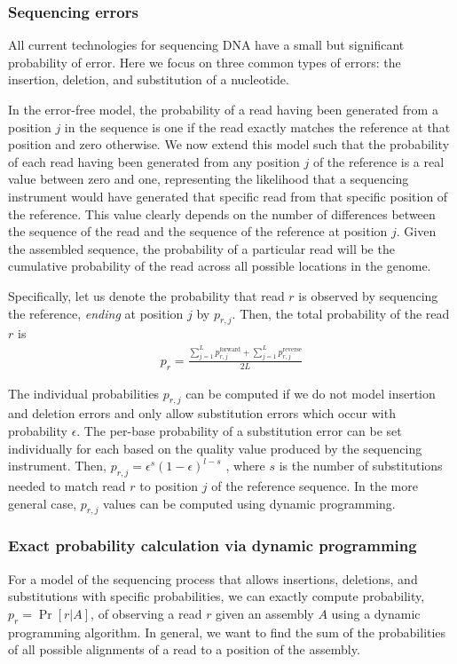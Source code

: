 \subsubsection{Sequencing errors}
\label{methods_errors}
All current technologies for sequencing DNA have a small but
significant probability of error.  Here we focus on three common types
of errors: the insertion, deletion, and substitution of a nucleotide.

In the error-free model, the probability of a read having been
generated from a position $j$ in the sequence is one if the read
exactly matches the reference at that position and zero otherwise.  We
now extend this model such that the probability of each read having
been generated from any position $j$ of the reference is a real value
between zero and one, representing the likelihood that a sequencing
instrument would have generated that specific read from that specific
position of the reference.  This value clearly depends on the number of differences
between the sequence of the read and the sequence of the reference at
position $j$.  Given the assembled sequence, the probability of a particular read will be the cumulative probability of the read
across all possible locations in the genome.

Specifically, let us denote the probability that read $r$ is observed
by sequencing the reference, \emph{ending} at position $j$ by
$p_{r,j}$.  Then, the total probability of the read $r$ is
\begin{align}
\label{prob_error_sum}
p_r = \frac{{\sum_{j=1}^{L} p^{\text{forward}}_{r,j}} + {\sum_{j = 1}^{L} p^{\text{reverse}}_{r,j}}}{2L}
\end{align}

The individual probabilities $p_{r,j}$ can be computed if we
do not model insertion and
deletion errors and only allow substitution errors which occur with probability $\epsilon$.  The per-base probability of a substitution error can be set individually for each based on the quality value
produced by the sequencing instrument. Then, $p_{r, j} = \epsilon^{s}(1 - \epsilon)^{l - s}$
, where $s$ is the number of substitutions needed to match read $r$ to
position $j$ of the reference sequence.
In the more general case,
$p_{r,j}$ values can be computed using dynamic programming.

\subsubsection{Exact probability calculation via dynamic programming}
\label{methods_dynamic}
For a model of the sequencing process that allows insertions, deletions,
and substitutions with specific probabilities, we can exactly compute
probability, $p_r = \Pr[r \vert A]$, of observing a read $r$ given an
assembly $A$ using a dynamic programming algorithm.  In general, we
want to find the sum of the probabilities of all possible alignments of a
read to a position of the assembly.


